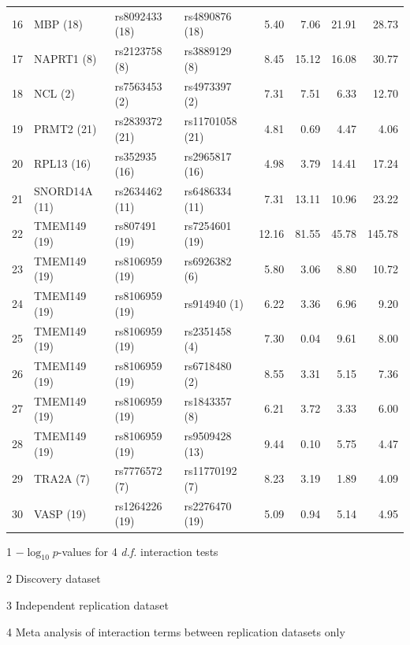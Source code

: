 \documentclass{article}
\begin{document}
\begin{table}[ht]
\begin{threeparttable}
{\begin{tabular}{rlllrrrr}
  16 & MBP (18)  & rs8092433 (18)  & rs4890876 (18)  & 5.40 & 7.06 & 21.91 & 28.73 \\
  17 & NAPRT1 (8)  & rs2123758 (8)  & rs3889129 (8)  & 8.45 & 15.12 & 16.08 & 30.77 \\
  18 & NCL (2)  & rs7563453 (2)  & rs4973397 (2)  & 7.31 & 7.51 & 6.33 & 12.70 \\
  19 & PRMT2 (21)  & rs2839372 (21)  & rs11701058 (21)  & 4.81 & 0.69 & 4.47 & 4.06 \\
  20 & RPL13 (16)  & rs352935 (16)  & rs2965817 (16)  & 4.98 & 3.79 & 14.41 & 17.24 \\
  21 & SNORD14A (11)  & rs2634462 (11)  & rs6486334 (11)  & 7.31 & 13.11 & 10.96 & 23.22 \\
  22 & TMEM149 (19)  & rs807491 (19)  & rs7254601 (19)  & 12.16 & 81.55 & 45.78 & 145.78 \\
  23 & TMEM149 (19)  & rs8106959 (19)  & rs6926382 (6)  & 5.80 & 3.06 & 8.80 & 10.72 \\
  24 & TMEM149 (19)  & rs8106959 (19)  & rs914940 (1)  & 6.22 & 3.36 & 6.96 & 9.20 \\
  25 & TMEM149 (19)  & rs8106959 (19)  & rs2351458 (4)  & 7.30 & 0.04 & 9.61 & 8.00 \\
  26 & TMEM149 (19)  & rs8106959 (19)  & rs6718480 (2)  & 8.55 & 3.31 & 5.15 & 7.36 \\
  27 & TMEM149 (19)  & rs8106959 (19)  & rs1843357 (8)  & 6.21 & 3.72 & 3.33 & 6.00 \\
  28 & TMEM149 (19)  & rs8106959 (19)  & rs9509428 (13)  & 9.44 & 0.10 & 5.75 & 4.47 \\
  29 & TRA2A (7)  & rs7776572 (7)  & rs11770192 (7)  & 8.23 & 3.19 & 1.89 & 4.09 \\
  30 & VASP (19)  & rs1264226 (19)  & rs2276470 (19)  & 5.09 & 0.94 & 5.14 & 4.95 \\
   \hline
		\end{tabular}
		}
		\begin{tablenotes}
			\item [1] $-\log_{10} p$-values for 4 \emph{d.f.} interaction tests
			\item [2] Discovery dataset
			\item [3] Independent replication dataset
			\item [4] Meta analysis of interaction terms between replication datasets only
		\end{tablenotes}
	\end{threeparttable}
\end{table}
\end{document}
